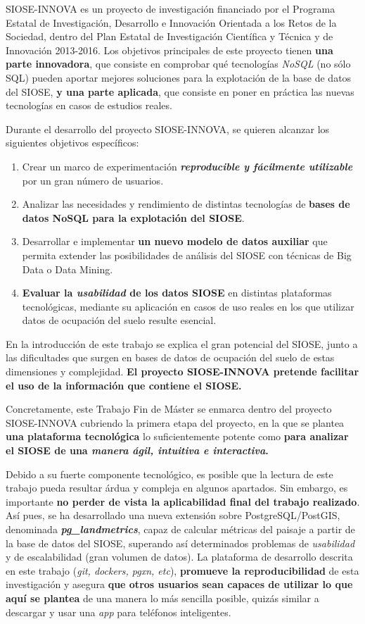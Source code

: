 \begin{prologo}
SIOSE-INNOVA es un proyecto de investigación financiado por el Programa Estatal de Investigación, Desarrollo e Innovación Orientada a los Retos de la Sociedad, dentro del Plan Estatal de Investigación Científica y Técnica y de Innovación 2013-2016. Los objetivos principales  de este proyecto tienen \textbf{una parte innovadora}, que consiste en comprobar qué tecnologías \textit{NoSQL} (no sólo SQL) pueden aportar mejores soluciones para la explotación de la base de datos del SIOSE, \textbf{y una parte aplicada}, que consiste en poner en práctica las nuevas tecnologías en casos de estudios reales.

Durante el desarrollo del proyecto SIOSE-INNOVA, se quieren alcanzar los siguientes objetivos específicos:
\begin{enumerate}
\item Crear un marco de experimentación \textbf{\textit{reproducible y fácilmente utilizable}} por un gran número de usuarios.
\item Analizar las necesidades y rendimiento de distintas tecnologías de \textbf{bases de datos NoSQL para la explotación del SIOSE}.
\item Desarrollar e implementar \textbf{un nuevo modelo de datos auxiliar} que permita extender las posibilidades de análisis del SIOSE con técnicas de Big Data o Data Mining.
\item \textbf{Evaluar la \textit{usabilidad} de los datos SIOSE} en distintas plataformas tecnológicas, mediante su aplicación en casos de uso reales en los que utilizar datos de ocupación del suelo resulte esencial.
\end{enumerate}

En la introducción de este trabajo se explica el gran potencial del SIOSE, junto a las dificultades que surgen en bases de datos de ocupación del suelo de estas dimensiones y complejidad. \textbf{El proyecto SIOSE-INNOVA pretende facilitar el uso de la información que contiene el SIOSE.}

Concretamente, este Trabajo Fin de Máster se enmarca dentro del proyecto SIOSE-INNOVA cubriendo la primera etapa del proyecto, en la que se plantea \textbf{una plataforma tecnológica} lo suficientemente potente como \textbf{para analizar el SIOSE de una \textit{manera ágil, intuitiva e interactiva}.}

Debido a su fuerte componente tecnológico, es posible que la lectura de este trabajo pueda resultar árdua y compleja en algunos apartados. Sin embargo, es importante \textbf{no perder de vista la aplicabilidad final del trabajo realizado}. Así pues, se ha desarrollado una nueva extensión sobre PostgreSQL/PostGIS, denominada \textbf{\textit{pg\_landmetrics}}, capaz de calcular métricas del paisaje a partir de la base de datos del SIOSE, superando así determinados problemas de \textit{usabilidad} y de escalabilidad (gran volumen de datos). La plataforma de desarrollo descrita en este trabajo (\textit{git, dockers, pgxn, etc}), \textbf{promueve la reproducibilidad} de esta investigación y asegura \textbf{que otros usuarios sean capaces de utilizar lo que aquí se plantea} de una manera lo más sencilla posible, quizás similar a descargar y usar una \textit{app} para teléfonos inteligentes.


\end{prologo}
